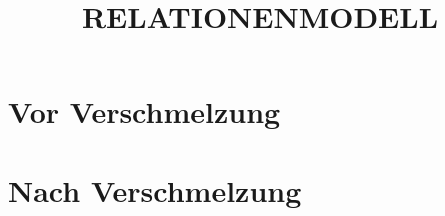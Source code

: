 \documentclass[12pt,a4paper]{article}
\title{RELATIONENMODELL}
\date{}
\begin{document}
	
	\maketitle
	
	\section{Vor Verschmelzung}

	\section{Nach Verschmelzung}
	
\end{document}
